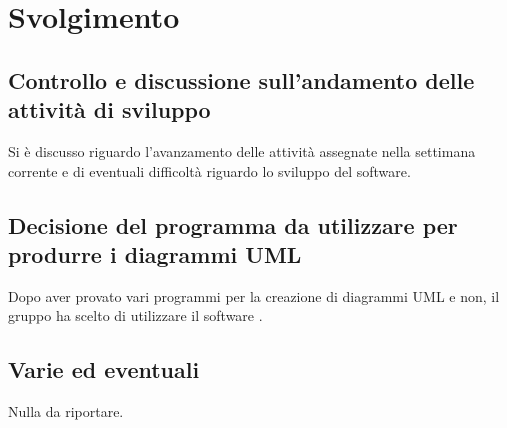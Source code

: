 \newpage
\section*{Svolgimento}

	\subsection*{Controllo e discussione sull'andamento delle attività di sviluppo}
		Si è discusso riguardo l'avanzamento delle attività assegnate nella settimana corrente e di eventuali difficoltà riguardo lo sviluppo del software.

	\subsection*{Decisione del programma da utilizzare per produrre i diagrammi UML}
		Dopo aver provato vari programmi per la creazione di diagrammi UML e non, il gruppo ha scelto di utilizzare il software .

	\subsection*{Varie ed eventuali}
		Nulla da riportare.
